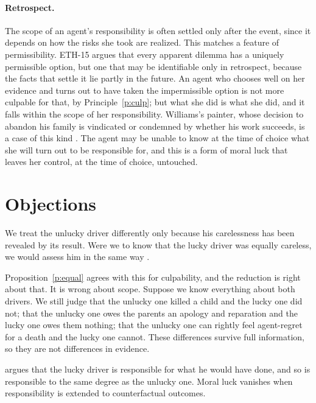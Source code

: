 \documentclass{situationist-preprint}
\begin{document}
\paragraph{Retrospect.} The scope of an agent's responsibility is often settled only after the event, since it depends on how the risks she took are realized. This matches a feature of permissibility. ETH-15 argues that every apparent dilemma has a uniquely permissible option, but one that may be identifiable only in retrospect, because the facts that settle it lie partly in the future. An agent who chooses well on her evidence and turns out to have taken the impermissible option is not more culpable for that, by Principle~\ref{p:culp}; but what she did is what she did, and it falls within the scope of her responsibility. Williams's painter, whose decision to abandon his family is vindicated or condemned by whether his work succeeds, is a case of this kind \citep{Williams1976}. The agent may be unable to know at the time of choice what she will turn out to be responsible for, and this is a form of moral luck that leaves her control, at the time of choice, untouched.

\section{Objections}

\begin{objection}
We treat the unlucky driver differently only because his carelessness has been revealed by its result. Were we to know that the lucky driver was equally careless, we would assess him in the same way \citep{Richards1986}.
\end{objection}

\begin{reply}
Proposition~\ref{p:equal} agrees with this for culpability, and the reduction is right about that. It is wrong about scope. Suppose we know everything about both drivers. We still judge that the unlucky one killed a child and the lucky one did not; that the unlucky one owes the parents an apology and reparation and the lucky one owes them nothing; that the unlucky one can rightly feel agent-regret for a death and the lucky one cannot. These differences survive full information, so they are not differences in evidence.
\end{reply}

\begin{objection}
\citet{Zimmerman1987} argues that the lucky driver is responsible for what he would have done, and so is responsible to the same degree as the unlucky one. Moral luck vanishes when responsibility is extended to counterfactual outcomes.
\end{objection}
\end{document}
